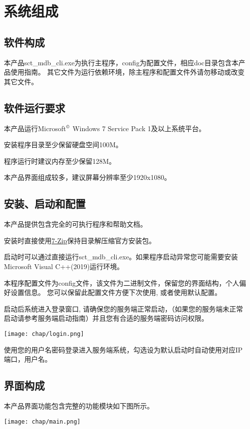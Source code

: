 \section{系统组成}\label{sys}

\linespread{1.2}
\large

\subsection{软件构成}
\bigskip
本产品sct\_mdb\_cli.exe为执行主程序，config为配置文件，相应doc目录包含本产品使用指南。
其它文件为运行依赖环境，除主程序和配置文件外请勿移动或改变其它文件。

\subsection{软件运行要求}
\bigskip
本产品运行Microsoft$^\copyright$ Windows 7 Service Pack 1及以上系统平台。

安装程序目录至少保留硬盘空间100M。

程序运行时建议内存至少保留128M。

本产品界面组成较多，建议屏幕分辨率至少1920x1080。

\subsection{安装、启动和配置}
本产品提供包含完全的可执行程序和帮助文档。

安装时直接使用\href{http://www.7-zip.org}{7-Zip}保持目录解压缩官方安装包。

启动时可以通过直接运行sct\_mdb\_cli.exe。如果程序启动异常您可能需要安装Microsoft Visual C++(2019)运行环境。

本程序配置文件为config文件，该文件为二进制文件，保留您的界面结构，个人偏好设置信息。
您可以保留此配置文件方便下次使用, 或者使用默认配置。

启动后系统进入登录窗口, 请确保您的服务端正常启动，（如果您的服务端未正常启动请参考服务端启动指南）并且您有合适的服务端密码访问权限。
\begin{center}
\texttt{[image: chap/login.png]}
\end{center}
使用您的用户名密码登录进入服务端系统，勾选设为默认启动时自动使用对应IP端口，用户名。

\subsection{界面构成}
\bigskip
本产品界面功能包含完整的功能模块如下图所示。
\begin{center}
\texttt{[image: chap/main.png]}
\end{center}


